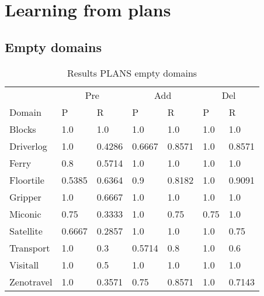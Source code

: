 \documentclass[]{article}
\title{}
\author{}
\begin{document}
\maketitle

%

\section{Learning from plans}
\subsection{Empty domains}
\begin{table}[H]
	\caption{Results PLANS empty domains}
	\label{tab:results_plans_empty}
	\begin{center}
		\begin{tabular}{l|l|l|l|l|l|l|}
			 & \multicolumn{2}{|c|}{Pre} & \multicolumn{2}{|c|}{Add} & \multicolumn{2}{|c|}{Del}  \\ \cline{2-7}			 
			 Domain & P & R & P & R & P & R \\
			\hline
			Blocks & 1.0 & 1.0 & 1.0 & 1.0 & 1.0 & 1.0 \\
			Driverlog & 1.0 & 0.4286 & 0.6667 & 0.8571 & 1.0 & 0.8571 \\
			Ferry & 0.8 & 0.5714 & 1.0 & 1.0 & 1.0 & 1.0 \\
			Floortile & 0.5385 & 0.6364 & 0.9 & 0.8182 & 1.0 & 0.9091 \\
			Gripper & 1.0 & 0.6667 & 1.0 & 1.0 & 1.0 & 1.0 \\
			Miconic & 0.75 & 0.3333 & 1.0 & 0.75 & 0.75 & 1.0 \\
			Satellite & 0.6667 & 0.2857 & 1.0 & 1.0 & 1.0 & 0.75 \\
			Transport & 1.0 & 0.3 & 0.5714 & 0.8 & 1.0 & 0.6 \\
			Visitall & 1.0 & 0.5 & 1.0 & 1.0 & 1.0 & 1.0 \\
			Zenotravel & 1.0 & 0.3571 & 0.75 & 0.8571 & 1.0 & 0.7143 \\
		\end{tabular}
	\end{center}	
\end{table}
\end{document}
